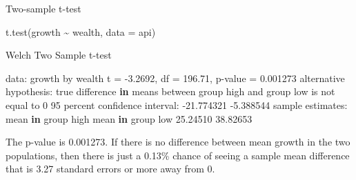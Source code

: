 \documentclass[
  10pt,
  ignorenonframetext,
]{beamer}
\newenvironment{Shaded}{\begin{snugshade}}{\end{snugshade}}
\newcommand{\AttributeTok}[1]{\textcolor[rgb]{0.77,0.63,0.00}{#1}}
\newcommand{\ControlFlowTok}[1]{\textcolor[rgb]{0.13,0.29,0.53}{\textbf{#1}}}
\newcommand{\DecValTok}[1]{\textcolor[rgb]{0.00,0.00,0.81}{#1}}
\newcommand{\FloatTok}[1]{\textcolor[rgb]{0.00,0.00,0.81}{#1}}
\newcommand{\FunctionTok}[1]{\textcolor[rgb]{0.00,0.00,0.00}{#1}}
\newcommand{\NormalTok}[1]{#1}
\newcommand{\OtherTok}[1]{\textcolor[rgb]{0.56,0.35,0.01}{#1}}
\newcommand{\SpecialCharTok}[1]{\textcolor[rgb]{0.00,0.00,0.00}{#1}}
\let\oldShaded\Shaded
\let\endoldShaded\endShaded
\renewenvironment{Shaded}{\tiny\oldShaded}{\endoldShaded}
\begin{document}
\begin{frame}[fragile]{Two-sample t-test}
\protect\hypertarget{two-sample-t-test}{}
\begin{Shaded}
\begin{Highlighting}[]
\FunctionTok{t.test}\NormalTok{(growth }\SpecialCharTok{\textasciitilde{}}\NormalTok{ wealth, }\AttributeTok{data =}\NormalTok{ api)}

\NormalTok{    Welch Two Sample t}\SpecialCharTok{{-}}\NormalTok{test}

\NormalTok{data}\SpecialCharTok{:}\NormalTok{  growth by wealth}
\NormalTok{t }\OtherTok{=} \SpecialCharTok{{-}}\FloatTok{3.2692}\NormalTok{, df }\OtherTok{=} \FloatTok{196.71}\NormalTok{, p}\SpecialCharTok{{-}}\NormalTok{value }\OtherTok{=} \FloatTok{0.001273}
\NormalTok{alternative hypothesis}\SpecialCharTok{:}\NormalTok{ true difference }\ControlFlowTok{in}\NormalTok{ means between group high and group low is not equal to }\DecValTok{0}
\DecValTok{95}\NormalTok{ percent confidence interval}\SpecialCharTok{:}
 \SpecialCharTok{{-}}\FloatTok{21.774321}  \SpecialCharTok{{-}}\FloatTok{5.388544}
\NormalTok{sample estimates}\SpecialCharTok{:}
\NormalTok{mean }\ControlFlowTok{in}\NormalTok{ group high  mean }\ControlFlowTok{in}\NormalTok{ group low }
          \FloatTok{25.24510}           \FloatTok{38.82653} 
\end{Highlighting}
\end{Shaded}

The p-value is 0.001273. If there is no difference between mean growth
in the two populations, then there is just a 0.13\% chance of seeing a
sample mean difference that is 3.27 standard errors or more away from 0.
\end{frame}
\end{document}
